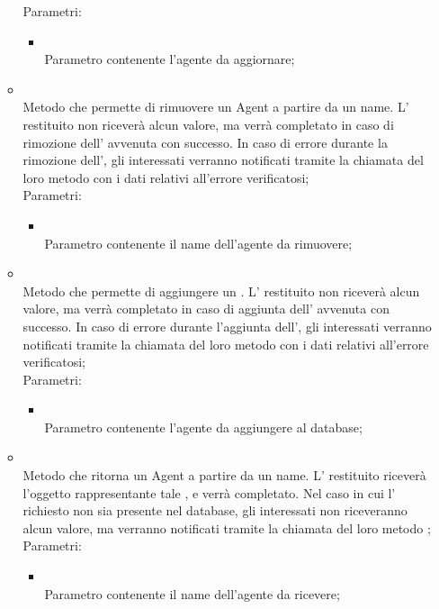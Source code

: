 \begin{itemize}
\begin{itemize}
		Parametri:
		\begin{itemize}
			\item {} \\
			Parametro contenente l'agente da aggiornare;
		\end{itemize}
		\item[]  \\
		Metodo che permette di rimuovere un Agent a partire da un name.  L' restituito non riceverà alcun valore, ma verrà completato in caso di rimozione dell' avvenuta con successo. In caso di errore durante la rimozione dell', gli  interessati verranno notificati tramite la chiamata del loro metodo  con i dati relativi all'errore verificatosi;\\
		Parametri:
		\begin{itemize}
			\item {} \\
			Parametro contenente il name dell'agente da rimuovere;
		\end{itemize}
		\item[]  \\
		Metodo che permette di aggiungere un .  L' restituito non riceverà alcun valore, ma verrà completato in caso di aggiunta dell' avvenuta con successo. In caso di errore durante l'aggiunta dell', gli  interessati verranno notificati tramite la chiamata del loro metodo  con i dati relativi all'errore verificatosi;\\
		Parametri:
		\begin{itemize}
			\item {} \\
			Parametro contenente l'agente da aggiungere al database;
		\end{itemize}
		\item[]  \\
		Metodo che ritorna un Agent a partire da un name. L' restituito riceverà l'oggetto rappresentante tale , e verrà completato. Nel caso in cui l' richiesto non sia presente nel database, gli  interessati non riceveranno alcun valore, ma verranno notificati tramite la chiamata del loro metodo ;\\
		Parametri:
		\begin{itemize}
			\item {} \\
			Parametro contenente il name dell'agente da ricevere;
		\end{itemize}
	\end{itemize}
\end{itemize}

